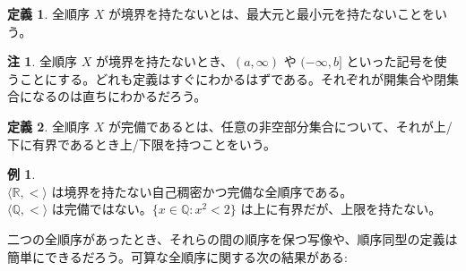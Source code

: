 \documentclass{jsarticle}
\theoremstyle{definition}
\newtheorem*{definition*}{定義}
\newtheorem{remark}{注}[section]
\newtheorem{example}{例}[section]
\begin{document}
    \vspace{0.5ex}
    
    \begin{definition*} 全順序 $X$ が境界を持たないとは、最大元と最小元を持たないことをいう。
    \end{definition*}
    
    \begin{remark}
        全順序 $X$ が境界を持たないとき、$(a, \infty)$ や $(-\infty, b]$ といった記号を使うことにする。どれも定義はすぐにわかるはずである。それぞれが開集合や閉集合になるのは直ちにわかるだろう。
    \end{remark}

    \vspace{0.5ex}
     
    \begin{definition*} 全順序 $X$ が完備であるとは、任意の非空部分集合について、それが上/下に有界であるとき上/下限を持つことをいう。
    \end{definition*}
    
    \begin{example} \ \\
        $\langle \mathbb{R}, < \rangle$ は境界を持たない自己稠密かつ完備な全順序である。\\
        $\langle \mathbb{Q}, < \rangle$ は完備ではない。$\{x \in \mathbb{Q} : x^2 < 2\}$ は上に有界だが、上限を持たない。
    \end{example}
    
    \vspace{0.5ex}
    
    二つの全順序があったとき、それらの間の順序を保つ写像や、順序同型の定義は簡単にできるだろう。可算な全順序に関する次の結果がある:
    
\end{document}
